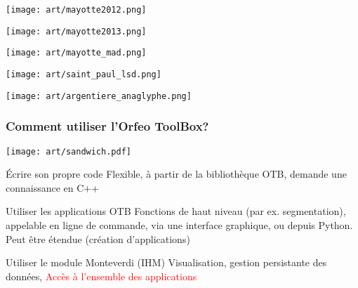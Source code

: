 \documentclass[8pt]{beamer}
\begin{document}
\begin{frame}[plain]
\hspace*{-11mm}
    \texttt{[image: art/mayotte2012.png]}
\end{frame}

\vspace*{-6.5mm}
\begin{frame}[plain]
\hspace*{-11mm}
    \texttt{[image: art/mayotte2013.png]}
\end{frame}

\vspace*{-6.5mm}
\begin{frame}[plain]
\hspace*{-11mm}
    \texttt{[image: art/mayotte\_mad.png]}
\end{frame}

\vspace*{-6.5mm}
\begin{frame}[plain]
\hspace*{-11mm}
\texttt{[image: art/saint\_paul\_lsd.png]}
\end{frame}

\vspace*{-6.5mm}
\begin{frame}[plain]
\hspace*{-11mm}
    \texttt{[image: art/argentiere\_anaglyphe.png]}
\end{frame}

\begin{frame}
\frametitle{Comment utiliser l'Orfeo ToolBox?}
\vspace{-0.5cm}
\begin{center}
\texttt{[image: art/sandwich.pdf]}
\end{center}
\vspace{-0.5cm}
\begin{block}{Écrire son propre code}
 Flexible, à partir de la bibliothèque OTB, demande une connaissance en C++
\end{block}
\begin{block}{Utiliser les applications OTB}
 Fonctions de haut niveau (par ex. segmentation), appelable en ligne de commande, via une interface graphique, ou depuis Python. Peut être étendue (création d'applications)
\end{block}
\begin{block}{Utiliser le module Monteverdi (IHM)}
Visualisation, gestion persistante des données, \textcolor{red}{Accès à l'ensemble des applications}
\end{block}
\end{frame}
\end{document}

